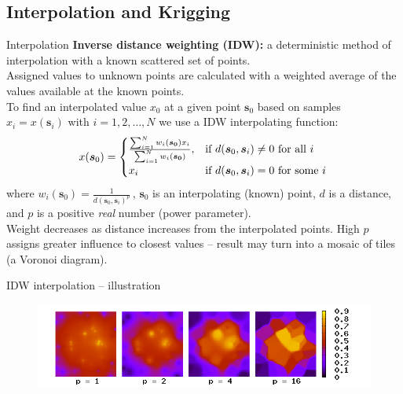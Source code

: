 \documentclass{beamer}
\begin{document}
\subsection{Interpolation and Krigging}
\begin{frame}{Interpolation}
\textbf{Inverse distance weighting (IDW):} a deterministic method of interpolation with a known scattered set of points. \\ \smallskip Assigned values to unknown points are calculated with a weighted average of the values available at the known points.
\\ \smallskip 
To find an interpolated value $x_0$ at a given point $\bm{s}_0$ based on samples $x_i=x(\bm{s}_i)$ with $i=1,2,\dots,N$ we use a IDW interpolating function:
$$
x(\bm{s}_0) = 
\begin{cases}
    \frac{\sum_{i=1}^N w_i(\bm{s_0})x_i}{\sum_{i=1}^N w_i(\bm{s_0})}, & 
    \textnormal{if~} d(\bm{s}_0,\bm{s}_i) \neq 0 \textnormal{~for all~}i\\
    x_i & \textnormal{if~} d(\bm{s}_0,\bm{s}_i)=0 \textnormal{~for some~}i \, 
\end{cases} 
$$
where $w_i(\bm{s}_0)=\frac{1}{d(\bm{s}_0,\bm{s}_i)^p}\,$, $\bm{s}_0$ is an interpolating (known) point, $d$ is a distance, and $p$ is a positive \textit{real} number (power parameter). \\ \smallskip
Weight decreases as distance increases from the interpolated points. High $p$ assigns greater influence to closest values -- result may turn into a mosaic of tiles (a Voronoi diagram). 
\end{frame}
\begin{frame}{IDW interpolation -- illustration}
\begin{figure}
	\includegraphics[width=.7\textwidth]{IMG/sp_idw.png}
\end{figure}
\end{frame}
\end{document}
